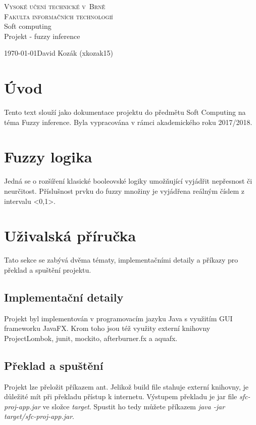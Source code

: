 \documentclass[12pt,a4paper,titlepage]{article}
\begin{document}
\begin{titlepage}
\begin{center}
    {
    	\Huge\textsc{Vysoké učení technické v~Brně}}\\
    \smallskip
    {
    	\huge\textsc{Fakulta informačních technologií}}\\
    \bigskip
    \huge{Soft computing}\\
    \smallskip
    \Huge{Projekt - fuzzy inference}\\
\end{center}
    {\Large \today \hfill David Kozák (xkozak15)  }\\
\end{titlepage}

\newpage
\tableofcontents
\newpage

\section{Úvod}
Tento text slouží jako dokumentace projektu do předmětu Soft Computing na téma Fuzzy inference. Byla vypracována v rámci akademického roku 2017/2018. 

\section{Fuzzy logika}
Jedná se o rozšíření klasické booleovské logiky umožňující vyjádřit nepřesnost či neurčitost. Příslušnost prvku do fuzzy množiny je vyjádřena reálným číslem z intervalu <0,1>. 

\section{Uživalská příručka}
Tato sekce se zabývá dvěma tématy, implementačními detaily a příkazy pro překlad a spuštění projektu.

\subsection{Implementační detaily}
Projekt byl implementován v programovacím jazyku Java s využitím GUI frameworku JavaFX. Krom toho jsou též využity externí knihovny ProjectLombok, junit, mockito, afterburner.fx a aquafx.

\subsection{Překlad a spuštění}
Projekt lze přeložit příkazem ant. Jelikož build file stahuje externí knihovny, je důležité mít při překladu přístup k internetu. Výstupem překladu je jar file \textit{sfc-proj-app.jar} ve složce \textit{target}. Spustit ho tedy můžete příkazem \textit{java -jar target/sfc-proj-app.jar}.
\end{document}
